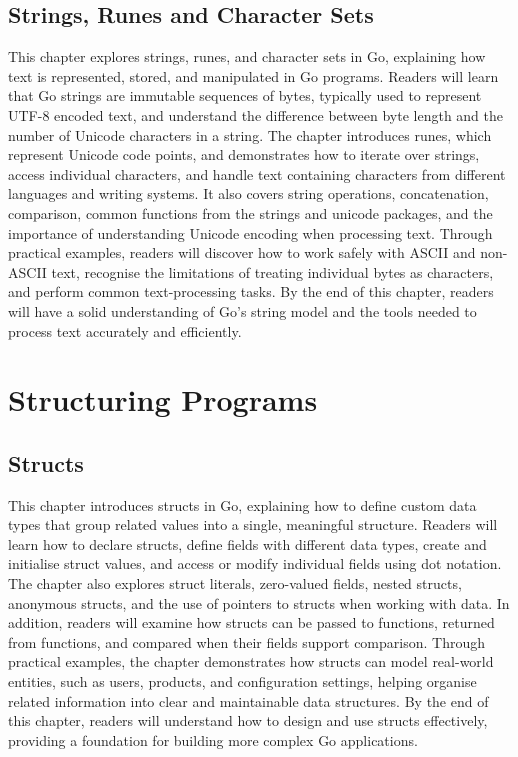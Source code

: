 \documentclass[12pt,oneside]{book}
\begin{document}
\chapter{Strings, Runes and Character Sets}
\begin{chaptersummary}
This chapter explores strings, runes, and character sets in Go, explaining how text is represented, stored, and manipulated in Go programs. Readers will learn that Go strings are immutable sequences of bytes, typically used to represent UTF-8 encoded text, and understand the difference between byte length and the number of Unicode characters in a string. The chapter introduces runes, which represent Unicode code points, and demonstrates how to iterate over strings, access individual characters, and handle text containing characters from different languages and writing systems. It also covers string operations, concatenation, comparison, common functions from the strings and unicode packages, and the importance of understanding Unicode encoding when processing text. Through practical examples, readers will discover how to work safely with ASCII and non-ASCII text, recognise the limitations of treating individual bytes as characters, and perform common text-processing tasks. By the end of this chapter, readers will have a solid understanding of Go’s string model and the tools needed to process text accurately and efficiently.
\end{chaptersummary}


\part{Structuring Programs}

\chapter{Structs}
\begin{chaptersummary}
This chapter introduces structs in Go, explaining how to define custom data types that group related values into a single, meaningful structure. Readers will learn how to declare structs, define fields with different data types, create and initialise struct values, and access or modify individual fields using dot notation. The chapter also explores struct literals, zero-valued fields, nested structs, anonymous structs, and the use of pointers to structs when working with data. In addition, readers will examine how structs can be passed to functions, returned from functions, and compared when their fields support comparison. Through practical examples, the chapter demonstrates how structs can model real-world entities, such as users, products, and configuration settings, helping organise related information into clear and maintainable data structures. By the end of this chapter, readers will understand how to design and use structs effectively, providing a foundation for building more complex Go applications.
\end{chaptersummary}

\end{document}
